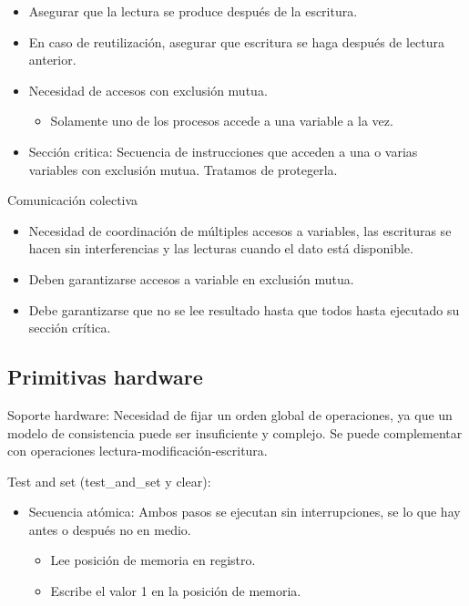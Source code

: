 \documentclass[12pt, twoside, openright]{report} %
\begin{document}
    \begin{itemize}
    
    \item
      Asegurar que la lectura se produce después de la escritura.
    \item
      En caso de reutilización, asegurar que escritura se haga después
      de lectura anterior.
    \item
      Necesidad de accesos con exclusión mutua.

      \begin{itemize}
      
      \item
        Solamente uno de los procesos accede a una variable a la vez.
      \end{itemize}
    \item
      Sección critica: Secuencia de instrucciones que acceden a una o
      varias variables con exclusión mutua. Tratamos de protegerla.
    \end{itemize}

    Comunicación colectiva

    \begin{itemize}
    
    \item
      Necesidad de coordinación de múltiples accesos a variables, las
      escrituras se hacen sin interferencias y las lecturas cuando el
      dato está disponible.
    \item
      Deben garantizarse accesos a variable en exclusión mutua.
    \item
      Debe garantizarse que no se lee resultado hasta que todos hasta
      ejecutado su sección crítica.
    \end{itemize}

\subsection{Primitivas hardware}



    Soporte hardware: Necesidad de fijar un orden global de
    operaciones, ya que un modelo de consistencia puede ser
    insuficiente y complejo. Se puede complementar con operaciones
    lectura-modificación-escritura.

    Test and set (test\_and\_set y clear):

    \begin{itemize}
    
    \item
      Secuencia atómica: Ambos pasos se ejecutan sin interrupciones,
      se lo que hay antes o después no en medio.

      \begin{itemize}
      
      \item
        Lee posición de memoria en registro.
      \item
        Escribe el valor 1 en la posición de memoria.
      \end{itemize}
    \end{itemize}
\end{document}
